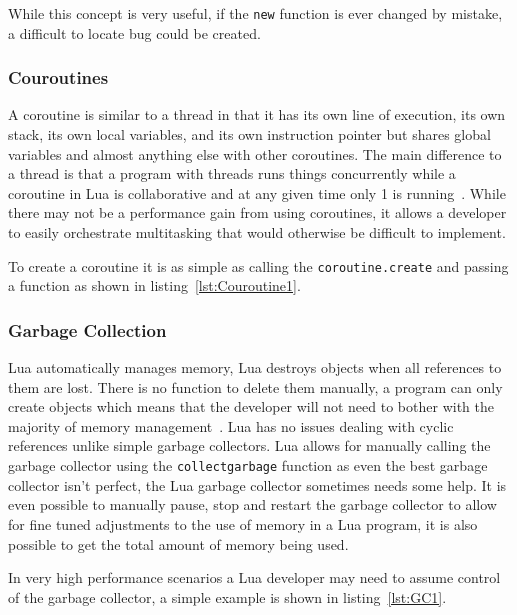 \documentclass[11pt,a4paper,titlepage]{article}
\begin{document}
			While this concept is very useful, if the \texttt{new} function is ever changed by mistake, a difficult to locate bug could be created.

		\subsubsection{Couroutines}
			A coroutine is similar to a thread in that it has its own line of execution, its own stack, its own local variables, and its own instruction pointer but shares global variables and almost anything else with other coroutines. The main difference to a thread is that a program with threads runs things concurrently while a coroutine in Lua is collaborative and at any given time only 1 is running~\cite{Ierusalimschy:2013:PLT:2502646}. While there may not be a performance gain from using coroutines, it allows a developer to easily orchestrate multitasking that would otherwise be difficult to implement.

			To create a coroutine it is as simple as calling the \texttt{coroutine.create} and passing a function as shown in listing~\ref{lst:Couroutine1}.
			 

		\subsubsection{Garbage Collection}

			Lua automatically manages memory, Lua destroys objects when all references to them are lost. There is no function to delete them manually, a program can only create objects which means that the developer will not need to bother with the majority of memory management~\cite{Ierusalimschy:2013:PLT:2502646}. Lua has no issues dealing with cyclic references unlike simple garbage collectors. Lua allows for manually calling the garbage collector using the \texttt{collectgarbage} function as even the best garbage collector isn't perfect, the Lua garbage collector sometimes needs some help. It is even possible to manually pause, stop and restart the garbage collector to allow for fine tuned adjustments to the use of memory in a Lua program, it is also possible to get the total amount of memory being used.

			In very high performance scenarios a Lua developer may need to assume control of the garbage collector, a simple example is shown in listing~\ref{lst:GC1}.
			
			
\end{document}
